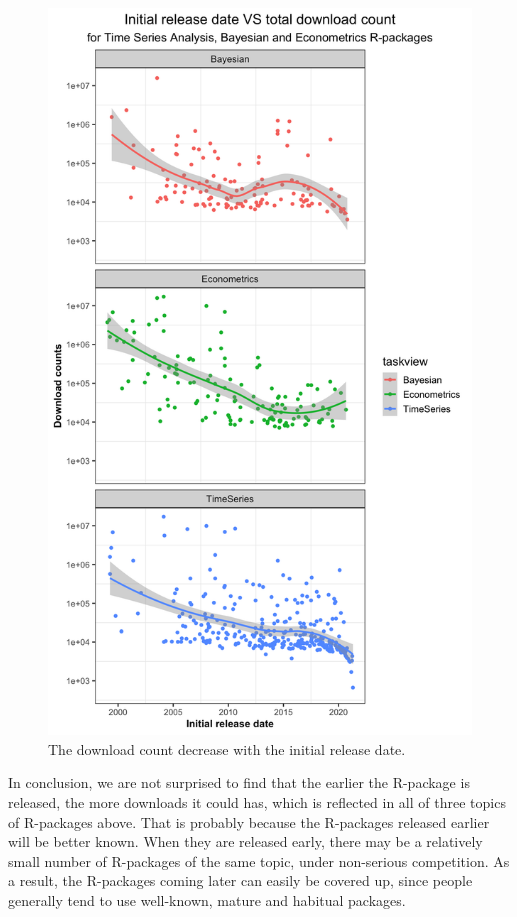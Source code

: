 \documentclass[
]{book}
\begin{document}
\begin{figure}

{\centering \includegraphics{figures/release-downloads-1} 

}

\caption{The download count decrease with the initial release date.}\label{fig:release-downloads}
\end{figure}

In conclusion, we are not surprised to find that the earlier the R-package is released, the more downloads it could has, which is reflected in all of three topics of R-packages above. That is probably because the R-packages released earlier will be better known. When they are released early, there may be a relatively small number of R-packages of the same topic, under non-serious competition. As a result, the R-packages coming later can easily be covered up, since people generally tend to use well-known, mature and habitual packages.
\end{document}

